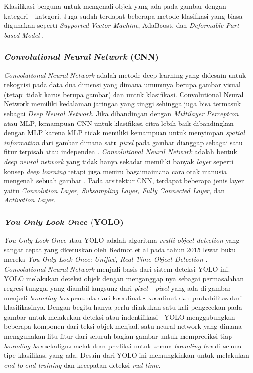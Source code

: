 \par Klasifikasi berguna untuk mengenali objek yang ada pada gambar dengan kategori - kategori. Juga sudah terdapat beberapa metode
klasifkasi yang biasa digunakan seperti \emph{Supported Vector Machine}, AdaBoost, dan \emph{Deformable Part-based Model} \cite{zhao2019object}.

\subsubsection{\emph{Convolutional Neural Network} (CNN)}
\label{sec:convolutionalneuralnetwork}

\par \emph{Convolutional Neural Network} adalah metode deep learning yang didesain untuk rekognisi pada data dua
dimensi yang dimana umumnya berupa gambar visual (tetapi tidak harus berupa gambar) dan untuk klasifikasi.
Convolutional Neural Network memiliki kedalaman jaringan yang tinggi sehingga juga bisa termasuk sebagai \emph{Deep Neural Network}.
Jika dibandingan dengan \emph{Multilayer Perceptron} atau MLP, kemampuan CNN untuk klasifikasi citra lebih baik dibandingkan dengan MLP karena MLP tidak memiliki
kemampuan untuk menyimpan \emph{spatial information} dari gambar dimana satu \emph{pixel} pada gambar dianggap sebagai satu fitur
terpisah atau independen \cite{putra2016klasifikasi}. \emph{Convolutional Neural Network} adalah bentuk \emph{deep neural network} yang tidak hanya
sekadar memiliki banyak \emph{layer} seperti konsep \emph{deep learning} tetapi juga meniru bagaimaimana cara otak manusia mengenali sebuah gambar \cite{kim2017convolutional}. Pada arsitektur CNN, terdapat beberapa jenis layer yaitu \emph{Convolution Layer, Subsampling Layer,
  Fully Connected Layer}, dan \emph{Activation Layer}.

\subsubsection{\emph{You Only Look Once} (YOLO)}
\label{sec:youonlylookone}

\emph{You Only Look Once} atau YOLO adalah algoritma \emph{multi object detection} yang sangat cepat yang dicetuskan oleh Redmot et al pada tahun 2015 lewat buku mereka \emph{You Only Look Once: Unified, Real-Time Object Detection} \cite{redmon2016you}. \emph{Convolutional Neural Network} menjadi basis dari sistem deteksi YOLO ini. YOLO melakukan deteksi objek dengan menganggap nya sebagai permasalahan regresi tunggal yang diambil langsung dari \emph{pixel - pixel} yang ada di gambar menjadi \emph{bounding box} penanda dari koordinat - koordinat dan probabilitas dari klasifikasinya. Dengan begitu hanya perlu dilakukan satu kali pengecekan pada gambar untuk melakukan deteksi atau indentifikasi \cite{redmon2016you}. YOLO menggabungkan beberapa komponen dari teksi objek menjadi satu neural network yang dimana menggunakan fitu-fitur dari seluruh bagian gambar untuk memprediksi tiap \emph{bounding box} sekaligus melakukan prediksi untuk semua \emph{bounding box} di semua tipe klasifikasi yang ada. Desain dari YOLO ini memungkinkan untuk melakukan \emph{end to end training} dan kecepatan deteksi \emph{real time}.

